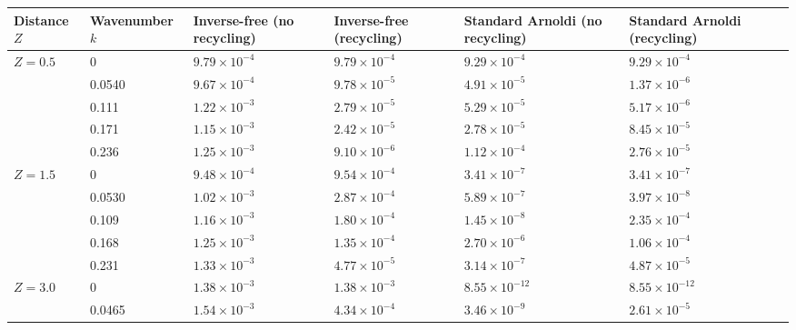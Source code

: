 \begin{table}[H]
    \centering
    \begin{tabular}{ |M{1.5cm}|M{2.0cm}|M{2.2cm} |M{2.2cm}|M{3cm}|M{3cm}|M{2.2cm}| } 
    \hline
    Distance $Z$ & Wavenumber $k$ &  Inverse-free (no recycling) & Inverse-free (recycling) & Standard Arnoldi (no recycling) & Standard Arnoldi (recycling)\\
    \hline
       & 0        & $9.79\times 10^{-4}$  & $9.79\times 10^{-4}$  &$9.29\times 10^{-4}$ &$9.29\times 10^{-4}$\\ 
                                   & 0.0540   & $9.67\times 10^{-4}$  & $9.78\times 10^{-5}$  &$4.91\times 10^{-5}$ &$1.37\times 10^{-6}$\\ 
                                   & 0.111    & $1.22\times 10^{-3}$  & $2.79\times 10^{-5}$  &$5.29\times 10^{-5}$ &$5.17\times 10^{-6}$\\ 
                                   & 0.171    & $1.15\times 10^{-3}$  & $2.42\times 10^{-5}$  &$2.78\times 10^{-5}$ &$8.45\times 10^{-5}$\\ 
                                   & 0.236    & $1.25\times 10^{-3}$  & $9.10\times 10^{-6}$  &$1.12\times 10^{-4}$ &$2.76\times 10^{-5}$\\ 
    \hline
    \hline
       & 0        & $9.48\times 10^{-4}$  & $9.54\times 10^{-4}$  &$3.41\times 10^{-7}$ &$3.41\times 10^{-7}$\\ 
                                   & 0.0530   & $1.02\times 10^{-3}$  & $2.87\times 10^{-4}$  &$5.89\times 10^{-7}$ &$3.97\times 10^{-8}$\\ 
                                   & 0.109    & $1.16\times 10^{-3}$  & $1.80\times 10^{-4}$  &$1.45\times 10^{-8}$ &$2.35\times 10^{-4}$\\ 
                                   & 0.168    & $1.25\times 10^{-3}$  & $1.35\times 10^{-4}$  &$2.70\times 10^{-6}$ &$1.06\times 10^{-4}$\\ 
                                   & 0.231    & $1.33\times 10^{-3}$  & $4.77\times 10^{-5}$  &$3.14\times 10^{-7}$ &$4.87\times 10^{-5}$\\ 
    \hline
    \hline
       & 0        & $1.38\times 10^{-3}$  & $1.38\times 10^{-3}$  &$8.55\times 10^{-12}$ &$8.55\times 10^{-12}$\\ 
                                   & 0.0465   & $1.54\times 10^{-3}$  & $4.34\times 10^{-4}$  &$3.46\times 10^{-9}$  &$2.61\times 10^{-5}$\\ 

\end{tabular}
\end{table}
